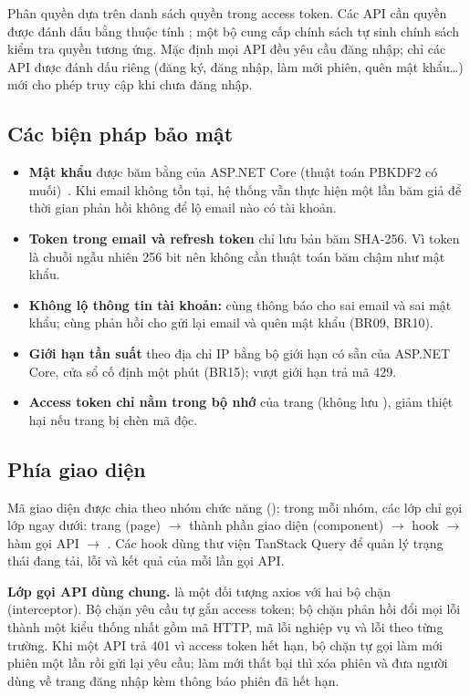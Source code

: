 Phân quyền dựa trên danh sách quyền trong access token. Các API cần quyền được đánh dấu bằng thuộc
tính \code{[MustHavePermission]}; một bộ cung cấp chính sách tự sinh chính sách kiểm tra quyền tương
ứng. Mặc định mọi API đều yêu cầu đăng nhập; chỉ các API được đánh dấu riêng (đăng ký, đăng nhập, làm
mới phiên, quên mật khẩu\ldots) mới cho phép truy cập khi chưa đăng nhập.

\subsection{Các biện pháp bảo mật}

\begin{itemize}
  \item \textbf{Mật khẩu} được băm bằng  của ASP.NET Core (thuật toán PBKDF2 có
  muối)~\cite{owasp-password}. Khi email không tồn tại, hệ thống vẫn thực hiện một lần băm giả để thời
  gian phản hồi không để lộ email nào có tài khoản.
  \item \textbf{Token trong email và refresh token} chỉ lưu bản băm SHA-256. Vì token là chuỗi ngẫu nhiên
  256 bit nên không cần thuật toán băm chậm như mật khẩu.
  \item \textbf{Không lộ thông tin tài khoản:} cùng thông báo cho sai email và sai mật khẩu; cùng phản
  hồi cho gửi lại email và quên mật khẩu (BR09, BR10).
  \item \textbf{Giới hạn tần suất} theo địa chỉ IP bằng bộ giới hạn có sẵn của ASP.NET Core, cửa sổ cố
  định một phút (BR15); vượt giới hạn trả mã 429.
  \item \textbf{Access token chỉ nằm trong bộ nhớ} của trang (không lưu ), giảm
  thiệt hại nếu trang bị chèn mã độc.
\end{itemize}

\subsection{Phía giao diện}

Mã giao diện được chia theo nhóm chức năng (); trong mỗi nhóm, các lớp chỉ gọi lớp
ngay dưới: trang (page) $\rightarrow$ thành phần giao diện (component) $\rightarrow$ hook
$\rightarrow$ hàm gọi API $\rightarrow$ . Các hook dùng thư viện TanStack Query để quản
lý trạng thái đang tải, lỗi và kết quả của mỗi lần gọi API.

\textbf{Lớp gọi API dùng chung.}  là một đối tượng axios với hai bộ chặn
(interceptor). Bộ chặn yêu cầu tự gắn access token; bộ chặn phản hồi đổi mọi lỗi thành một kiểu thống
nhất gồm mã HTTP, mã lỗi nghiệp vụ và lỗi theo từng trường. Khi một API trả 401 vì access token hết
hạn, bộ chặn tự gọi làm mới phiên một lần rồi gửi lại yêu cầu; làm mới thất bại thì xóa phiên và đưa
người dùng về trang đăng nhập kèm thông báo phiên đã hết hạn.

